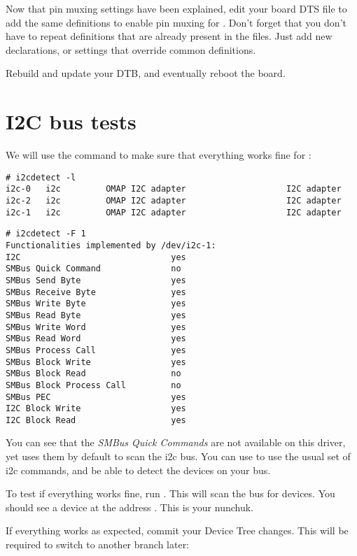 Now that pin muxing settings have been explained, edit your board
DTS file to add the same definitions to enable pin muxing for .
Don't forget that you don't have to repeat definitions that are
already present in the  files. Just add new declarations, or
settings that override common definitions.

Rebuild and update your DTB, and eventually reboot the board.

\section{I2C bus tests}

We will use the  command to make sure that
everything works fine for :

\begin{verbatim}
# i2cdetect -l
i2c-0	i2c       	OMAP I2C adapter                	I2C adapter
i2c-2	i2c       	OMAP I2C adapter                	I2C adapter
i2c-1	i2c       	OMAP I2C adapter                	I2C adapter
\end{verbatim}

\begin{verbatim}
# i2cdetect -F 1
Functionalities implemented by /dev/i2c-1:
I2C                              yes
SMBus Quick Command              no
SMBus Send Byte                  yes
SMBus Receive Byte               yes
SMBus Write Byte                 yes
SMBus Read Byte                  yes
SMBus Write Word                 yes
SMBus Read Word                  yes
SMBus Process Call               yes
SMBus Block Write                yes
SMBus Block Read                 no
SMBus Block Process Call         no
SMBus PEC                        yes
I2C Block Write                  yes
I2C Block Read                   yes
\end{verbatim}

You can see that the {\em SMBus Quick Commands} are not available on
this driver, yet  uses them by default to scan the i2c
bus. You can use  to use the usual set of i2c
commands, and be able to detect the devices on your bus.

To test if everything works fine, run . This will
scan the  bus for devices. You should see a device at the
address . This is your nunchuk.

If everything works as expected, commit your Device Tree changes. This
will be required to switch to another branch later:

